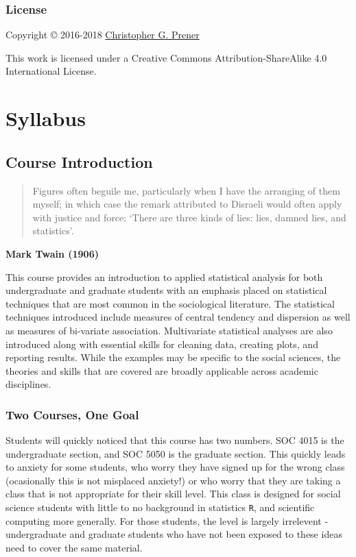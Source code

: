 \documentclass[]{book}
\theoremstyle{definition}
\theoremstyle{definition}
\theoremstyle{definition}
\theoremstyle{remark}
\begin{document}
\section*{License}\label{license}

Copyright © 2016-2018 \href{https://chris-prener.github.io}{Christopher
G. Prener}

This work is licensed under a Creative Commons Attribution-ShareAlike
4.0 International License.

\part{Syllabus}\label{part-syllabus}

\chapter{Course Introduction}\label{course-introduction}

\begin{quote}
Figures often beguile me, particularly when I have the arranging of them
myself; in which case the remark attributed to Disraeli would often
apply with justice and force: `There are three kinds of lies: lies,
damned lies, and statistics'.
\end{quote}

\textbf{Mark Twain (1906)}

This course provides an introduction to applied statistical analysis for
both undergraduate and graduate students with an emphasis placed on
statistical techniques that are most common in the sociological
literature. The statistical techniques introduced include measures of
central tendency and dispersion as well as measures of bi-variate
association. Multivariate statistical analyses are also introduced along
with essential skills for cleaning data, creating plots, and reporting
results. While the examples may be specific to the social sciences, the
theories and skills that are covered are broadly applicable across
academic disciplines.

\section{Two Courses, One Goal}\label{two-courses-one-goal}

Students will quickly noticed that this course has two numbers. SOC 4015
is the undergraduate section, and SOC 5050 is the graduate section. This
quickly leads to anxiety for some students, who worry they have signed
up for the wrong class (ocasionally this is not misplaced anxiety!) or
who worry that they are taking a class that is not appropriate for their
skill level. This class is designed for social science students with
little to no background in statistics \texttt{R}, and scientific
computing more generally. For those students, the level is largely
irrelevent - undergraduate and graduate students who have not been
exposed to these ideas need to cover the same material.
\end{document}
